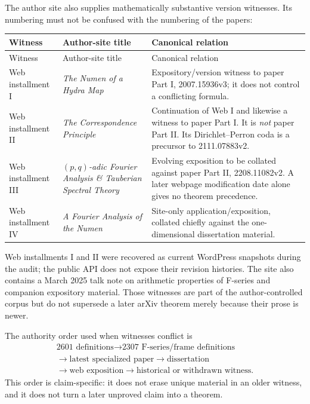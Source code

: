 The author site also supplies mathematically substantive version witnesses.
Its numbering must not be confused with the numbering of the papers:

\begingroup\small
\begin{longtable}{@{}p{}p{}p{}@{}}
\toprule
Witness & Author-site title & Canonical relation\\
\midrule
\endfirsthead
\toprule
Witness & Author-site title & Canonical relation\\
\midrule
\endhead
Web installment I & \emph{The Numen of a Hydra Map} & Expository/version
witness to paper Part I, 2007.15936v3; it does not control a conflicting
formula.\\
Web installment II & \emph{The Correspondence Principle} & Continuation of
Web I and likewise a witness to paper Part I.  It is \emph{not} paper Part
II.  Its Dirichlet--Perron coda is a precursor to 2111.07883v2.\\
Web installment III & \emph{$(p,q)$-adic Fourier Analysis \& Tauberian
Spectral Theory} & Evolving exposition to be collated against paper Part II,
2208.11082v2.  A later webpage modification date alone gives no theorem
precedence.\\
Web installment IV & \emph{A Fourier Analysis of the Numen} & Site-only
application/exposition, collated chiefly against the one-dimensional
dissertation material.\\
\bottomrule
\end{longtable}
\endgroup

Web installments I and II were recovered as current WordPress snapshots
during the audit; the public API does not expose their revision histories.
The site also contains a March 2025 talk note on arithmetic properties of
F-series and companion expository material.  Those witnesses are part of the
author-controlled corpus but do not supersede a later arXiv theorem merely
because their prose is newer.

The authority order used when witnesses conflict is
\[
\begin{gathered}
 \text{2601 definitions}\longrightarrow
 \text{2307 F-series/frame definitions}\\
 \longrightarrow\text{latest specialized paper}\longrightarrow
 \text{dissertation}\\
 \longrightarrow\text{web exposition}\longrightarrow
 \text{historical or withdrawn witness}.
\end{gathered}
\]
This order is claim-specific: it does not erase unique material in an older
witness, and it does not turn a later unproved claim into a theorem.

